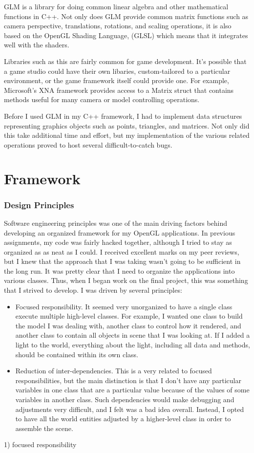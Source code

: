 \documentclass[journal]{IEEEtran}
\begin{document}
GLM is a library for doing common linear algebra and other mathematical functions in C++.  Not only does GLM provide common matrix functions such as camera perspective, translations, rotations, and scaling operations, it is also based on the OpenGL Shading Language, (GLSL) which means that it integrates well with the shaders.

Libraries such as this are fairly common for game development. It's possible that a game studio could have their own libaries, custom-tailored to a particular environment, or the game framework itself could provide one. For example, Microsoft's XNA framework provides access to a Matrix struct that contains methods useful for many camera or model controlling operations.

Before I used GLM in my C++ framework, I had to implement data structures representing graphics objects such as points, triangles, and matrices. Not only did this take additional time and effort, but my implementation of the various related operations proved to host several difficult-to-catch bugs.

\section{Framework}

\subsubsection{Design Principles}

Software engineering principles was one of the main driving factors behind developing an organized framework for my OpenGL applications. In previous assignments, my code was fairly hacked together, although I tried to stay as organized as as neat as I could. I received excellent marks on my peer reviews, but I knew that the approach that I was taking wasn't going to be sufficient in the long run. It was pretty clear that I need to organize the applications into various classes. Thus, when I began work on the final project, this was something that I strived to develop. I was driven by several principles:
\begin{itemize}
\item Focused responsibility. It seemed very unorganized to have a single class execute multiple high-level classes. For example, I wanted one class to build the model I was dealing with, another class to control how it rendered, and another class to contain all objects in scene that I was looking at. If I added a light to the world, everything about the light, including all data and methods, should be contained within its own class.
\item Reduction of inter-dependencies. This is a very related to focused responsibilities, but the main distinction is that I don't have any particular variables in one class that are a particular value because of the values of some variables in another class. Such dependencies would make debugging and adjustments very difficult, and I felt was a bad idea overall. Instead, I opted to have all the world entities adjusted by a higher-level class in order to assemble the scene.
\end{itemize}
1) focused responsibility
\end{document}
